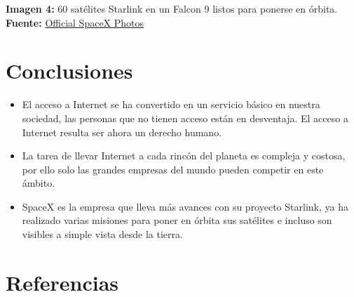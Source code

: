 \documentclass[12pt,spanish,Letterpaper,openany]{book}
\newcommand{\spacefivemilis}{\vspace{5mm}}
\begin{document}
\textbf{Imagen 4:} 60 satélites Starlink en un Falcon 9 listos para ponerse en órbita. \textbf{Fuente:} \href{https://www.space.com/spacex-starlink-satellites.html}{Official SpaceX Photos}


\spacefivemilis

\hypertarget{conclusiones-3}{%
\section*{Conclusiones}\label{conclusiones-3}}

\begin{itemize}
\item
  El acceso a Internet se ha convertido en un servicio básico en nuestra sociedad, las personas que no tienen acceso están en desventaja. El acceso a Internet resulta ser ahora un derecho humano.
\item
  La tarea de llevar Internet a cada rincón del planeta es compleja y costosa, por ello solo las grandes empresas del mundo pueden competir en este ámbito.
\item
  SpaceX es la empresa que lleva más avances con su proyecto Starlink, ya ha realizado varias misiones para poner en órbita sus satélites e incluso son visibles a simple vista desde la tierra.
\end{itemize}

\hypertarget{referencias-3}{%
\section*{Referencias}\label{referencias-3}}
\end{document}
